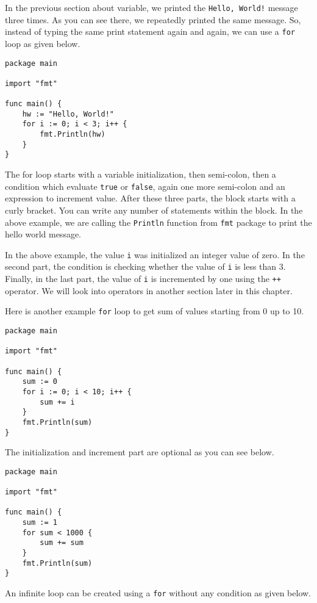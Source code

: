In the previous section about variable, we printed the \texttt{Hello,
World!}  message three times.  As you can see there, we repeatedly
printed the same message.  So, instead of typing the same print
statement again and again, we can use a \texttt{for} loop as given
below.

\begin{lstlisting}
package main

import "fmt"

func main() {
    hw := "Hello, World!"
    for i := 0; i < 3; i++ {
        fmt.Println(hw)
    }
}
\end{lstlisting}

The for loop starts with a variable initialization, then semi-colon,
then a condition which evaluate \texttt{true} or \texttt{false}, again
one more semi-colon and an expression to increment value.  After these
three parts, the block starts with a curly bracket.  You can write any
number of statements within the block.  In the above example, we are
calling the \texttt{Println} function from \texttt{fmt} package to
print the hello world message.

In the above example, the value \texttt{i} was initialized an integer
value of zero.  In the second part, the condition is checking whether
the value of \texttt{i} is less than 3.  Finally, in the last part,
the value of \texttt{i} is incremented by one using the \texttt{++}
operator.  We will look into operators in another section later in
this chapter.

Here is another example \texttt{for} loop to get sum of values
starting from 0 up to 10.

\begin{lstlisting}
package main

import "fmt"

func main() {
    sum := 0
    for i := 0; i < 10; i++ {
        sum += i
    }
    fmt.Println(sum)
}
\end{lstlisting}

The initialization and increment part are optional as you can see
below.

\begin{lstlisting}
package main

import "fmt"

func main() {
    sum := 1
    for sum < 1000 {
        sum += sum
    }
    fmt.Println(sum)
}
\end{lstlisting}

An infinite loop can be created using a \texttt{for} without any
condition as given below.

